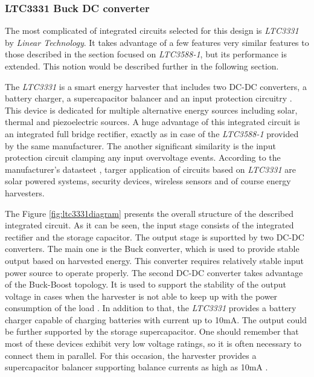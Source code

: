 \documentclass[12pt,a4paper]{article}
\begin{document}
\subsubsection{LTC3331 Buck DC converter}
The most complicated of integrated circuits selected for this design is \textit{LTC3331} by \textit{Linear Technology}. It takes advantage of a few features very similar features to those described in the section focused on \textit{LTC3588-1}, but its performance is extended. This notion would be described further in the following section.
\par
The \textit{LTC3331} is a smart energy harvester that includes two DC-DC converters, a battery charger, a supercapacitor balancer and an input protection circuitry \cite{ltc3331_params}. This device is dedicated for multiple alternative energy sources including solar, thermal and piezoelectric sources. A huge advantage of this integrated circuit is an integrated full bridge rectifier, exactly as in case of the \textit{LTC3588-1} provided by the same manufacturer. The another significant similarity is the input protection circuit clamping any input overvoltage events. According to the manufacturer's datasteet \cite{ltc3331_params}, targer application of circuits based on \textit{LTC3331} are solar powered systems, security devices, wireless sensors and of course energy harvesters.\par
The Figure \ref{fig:ltc3331diagram} presents the overall structure of the described integrated circuit. As it can be seen, the input stage consists of the integrated rectifier and the storage capacitor. The output stage is suportted by two DC-DC converters. The main one is the Buck converter, which is used to provide stable output based on harvested energy. This converter requires relatively stable input power source to operate properly. The second DC-DC converter takes advantage of the Buck-Boost topology. It is used to support the stability of the output voltage in cases when the harvester is not able to keep up with the power consumption of the load \cite{ltc3331_params}. In addition to that, the \textit{LTC3331} provides a battery charger capable of charging batteries with current up to 10mA. The output could be further supported by the storage supercapacitor. One should remember that most of these devices exhibit very low voltage ratings, so it is often necessary to connect them in parallel. For this occasion, the harvester provides a supercapacitor balancer supporting balance currents as high as 10mA \cite{ltc3331_params}.
\end{document}
